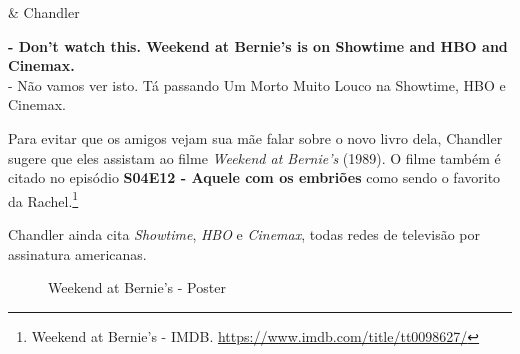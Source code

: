 \begin{tcolorbox}[enhanced,center upper,
    drop fuzzy shadow southeast, boxrule=0.3pt,
    lower separated=false, breakable,
    colframe=black!30!dialogoBorder,colback=white]
\begin{minipage}[c]{0.16\linewidth}
   & \centering \scriptsize{Chandler}
\end{minipage}
\hfill
\begin{minipage}[c]{0.8\linewidth}
  \textbf{- Don't watch this. Weekend at Bernie's is on Showtime and HBO and Cinemax.}\\
  - Não vamos ver isto. Tá passando Um Morto Muito Louco na Showtime, HBO e Cinemax.
\end{minipage}
\end{tcolorbox}

\saveparinfos
\noindent
\begin{minipage}[c]{0.5\textwidth}\useparinfo

Para evitar que os amigos vejam sua mãe falar sobre o novo livro dela,
Chandler sugere que eles assistam ao filme \emph{Weekend at Bernie's}
(1989). O filme também é citado no episódio
\textbf{\textcolor{primarycolor}{S04E12 - Aquele com os embriões}} como
sendo o favorito da Rachel.\footnote{\sloppy Weekend at Bernie’s - IMDB. \url{https://www.imdb.com/title/tt0098627/}}

Chandler ainda cita \emph{Showtime}, \emph{HBO} e \emph{Cinemax}, todas
redes de televisão por assinatura americanas.

\end{minipage}\hfill
\begin{minipage}[c]{0.5\textwidth}

\begin{figure}
  \centering
    \caption{Weekend at Bernie’s - Poster\label{fig:weekend-at-bernie-s-poster}}
\end{figure}

\end{minipage}

